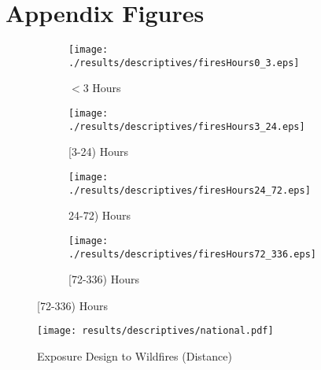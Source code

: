 \documentclass[11pt]{article}
\begin{document}
\section{Appendix Figures} 
\label{app:Figures}
\begin{spacing}{1.3}
\begin{figure}[htpb!]
    \centering
    \caption{Wildfire Exposures by Duration of Fire}
    \label{fig:firesHours}
    \begin{subfigure}{0.45\textwidth}
          \texttt{[image: ./results/descriptives/firesHours0\_3.eps]}
         \caption{$<$3 Hours}
    \end{subfigure}
    \begin{subfigure}{0.45\textwidth}
          \texttt{[image: ./results/descriptives/firesHours3\_24.eps]}
         \caption{[3-24) Hours}
    \end{subfigure}

    \begin{subfigure}{0.45\textwidth}
          \texttt{[image: ./results/descriptives/firesHours24\_72.eps]}
         \caption{24-72) Hours}
    \end{subfigure}
    \begin{subfigure}{0.45\textwidth}
          \texttt{[image: ./results/descriptives/firesHours72\_336.eps]}
         \caption{[72-336) Hours}
    \end{subfigure}
\end{figure}



\begin{figure}
    \centering
    \texttt{[image: results/descriptives/national.pdf]}
    \caption{Exposure Design to Wildfires (Distance)}
    \label{fig:designDist}
\end{figure}    






\end{spacing}
\end{document}
